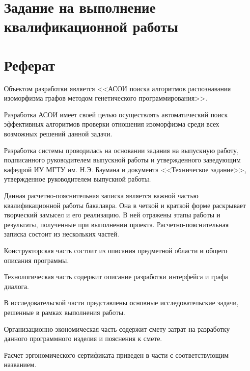 \documentclass[russian,utf8,emptystyle]{eskdtext}
\begin{document}


\section{Задание на выполнение квалификационной работы}
\newpage

\section{Реферат}
\begin{spacing}{1.5}
Объектом разработки является <<АСОИ поиска алгоритмов распознавания изоморфизма графов методом генетического программирования>>.

Разработка АСОИ имеет своей целью осуществлять автоматический поиск эффективных алгоритмов проверки отношения изоморфизма среди всех возможных решений данной задачи. 

Разработка системы проводилась на основании задания на выпускную работу, подписанного руководителем выпускной работы и утвержденного заведующим кафедрой ИУ МГТУ им. Н.Э. Баумана и документа <<Техническое задание>>, утвержденное руководителем выпускной работы.

Данная расчетно-пояснительная записка является важной частью квалификационной работы бакалавра. Она в четкой и краткой форме раскрывает творческий замысел и его реализацию. В ней отражены этапы работы и результаты, полученные при выполнении проекта. Расчетно-пояснительная записка состоит из нескольких частей.

Конструкторская часть состоит из описания предметной области и общего описания программы. 

Технологическая часть содержит описание разработки интерфейса и графа диалога.

В исследовательской части представлены основные исследовательские задачи, решенные в рамках выполнения работы.

Организационно-экономическая часть содержит смету затрат на разработку данного программного изделия и пояснения к смете.

Расчет эргономического сертификата приведен в части с соответствующим названием. 
\end{spacing}

\newpage
\tableofcontents
\newpage
\end{document}
